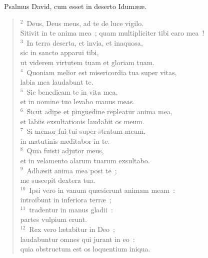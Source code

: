 ~\lettrine[lines=10,image=true,loversize=0.05,lraise=-0.03]{P}{}salmus David, cum esset in deserto Idum\ae \ae .
\begin{flushleft}\begin{verse}\vspace{6pt}${}^{2}$~Deus, Deus meus, ad te de luce vigilo.\\ Sitivit in te anima mea~; quam multipliciter tibi caro mea~!\\
${}^{3}$~In terra deserta, et invia, et inaquosa,\\ sic in sancto apparui tibi,\\ ut viderem virtutem tuam et gloriam tuam.\\
${}^{4}$~Quoniam melior est misericordia tua super vitas,\\ labia mea laudabunt te.\\
${}^{5}$~Sic benedicam te in vita mea,\\ et in nomine tuo levabo manus meas.\\
${}^{6}$~Sicut adipe et pinguedine repleatur anima mea,\\ et labiis exsultationis laudabit os meum.\\
${}^{7}$~Si memor fui tui super stratum meum,\\ in matutinis meditabor in te.\\
${}^{8}$~Quia fuisti adjutor meus,\\ et in velamento alarum tuarum exsultabo.\\
${}^{9}$~Adh\ae sit anima mea post te~;\\ me suscepit dextera tua.\\
${}^{10}$~Ipsi vero in vanum qu\ae sierunt animam meam~:\\ introibunt in inferiora terr\ae~;\\
${}^{11}$~tradentur in manus gladii~:\\ partes vulpium erunt.\\
${}^{12}$~Rex vero l\ae tabitur in Deo~;\\ laudabuntur omnes qui jurant in eo~:\\ quia obstructum est os loquentium iniqua.\end{verse}\end{flushleft}


